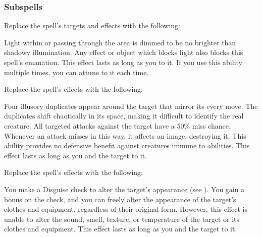 \subsubsection{Subspells}
Replace the spell's targets and effects with the following:
\begin{spellcontent}
\begin{augmenttargetinginfo}
\end{augmenttargetinginfo}
\begin{augmenteffects}
\spelleffect
Light within or passing through the area is dimmed to be no brighter than shadowy illumination.
Any effect or object which blocks light also blocks this spell's emanation.
This effect lasts as long as you  to it.
If you use this ability multiple times, you can attune to it each time.
\end{augmenteffects}
\end{spellcontent}
Replace the spell's effects with the following:
\begin{spellcontent}
\begin{augmenteffects}
\spelleffect
Four illusory duplicates appear around the target that mirror its every move.
The duplicates shift chaotically in its space, making it difficult to identify the real creature.
All targeted attacks against the target have a 50\% miss chance.
Whenever an attack misses in this way, it affects an image, destroying it.
This ability provides no defensive benefit against creatures immune to  abilities.
This effect lasts as long as you and the target  to it.
\end{augmenteffects}
\end{spellcontent}
Replace the spell's effects with the following:
\begin{spellcontent}
\begin{augmenteffects}
\spelleffect
You make a Disguise check to alter the target's appearance (see ).
You gain a  bonus on the check, and you can freely alter the appearance of the target's clothes and equipment, regardless of their original form.
However, this effect is unable to alter the sound, smell, texture, or temperature of the target or its clothes and equipment.
This effect lasts as long as you and the target  to it.
\end{augmenteffects}
\end{spellcontent}
